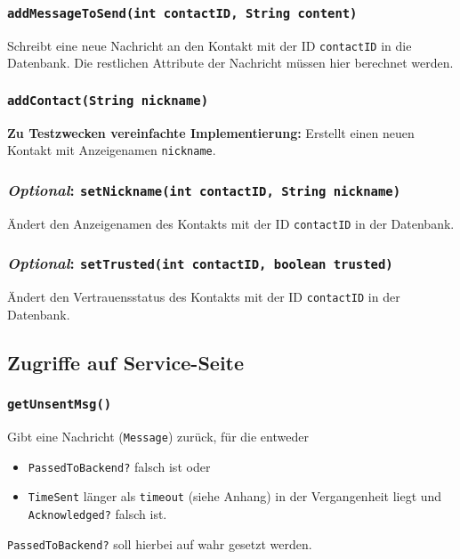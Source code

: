 \documentclass[a4paper]{article}
\begin{document}
    \subsubsection{\texttt{addMessageToSend(int contactID, String content)}}
    Schreibt eine neue Nachricht an den Kontakt mit der ID \texttt{contactID} in die Datenbank.
    Die restlichen Attribute der Nachricht müssen hier berechnet werden.

    \subsubsection{\texttt{addContact(String nickname)}}
    \textbf{Zu Testzwecken vereinfachte Implementierung:}
    Erstellt einen neuen Kontakt mit Anzeigenamen \texttt{nickname}.

    \subsubsection{\textit{Optional}: \texttt{setNickname(int contactID, String nickname)}}
    Ändert den Anzeigenamen des Kontakts mit der ID \texttt{contactID} in der Datenbank.

    \subsubsection{\textit{Optional}: \texttt{setTrusted(int contactID, boolean trusted)}}
    Ändert den Vertrauensstatus des Kontakts mit der ID \texttt{contactID} in der Datenbank.

    \subsection{Zugriffe auf Service-Seite}

    \subsubsection{\texttt{getUnsentMsg()}}
    Gibt eine Nachricht (\texttt{Message}) zurück, für die entweder
    \begin{itemize}
        \item
            \texttt{PassedToBackend?} falsch ist oder
        \item
            \texttt{TimeSent} länger als \texttt{timeout} (siehe Anhang) in der Vergangenheit liegt und \texttt{Acknowledged?} falsch ist.
    \end{itemize}
    \texttt{PassedToBackend?} soll hierbei auf wahr gesetzt werden.
\end{document}
